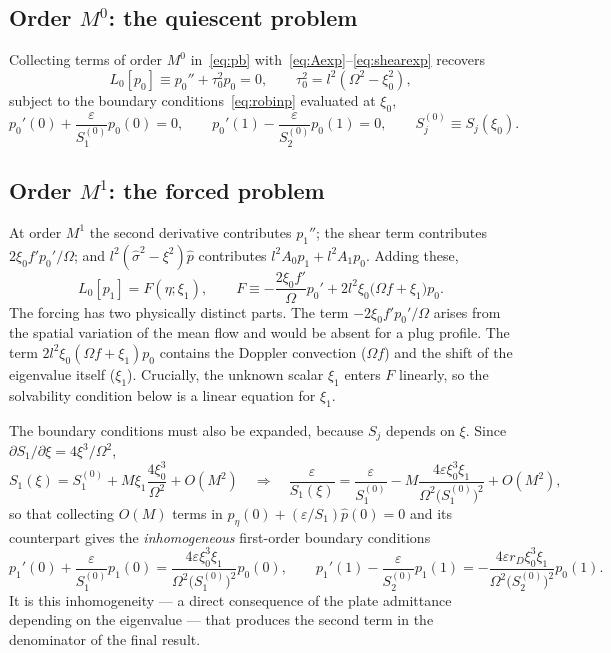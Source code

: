 \documentclass[11pt,a4paper]{article}
\newcommand{\Om}{\Omega}
\newcommand{\eps}{\varepsilon}
\newcommand{\sig}{\hat\sigma}
\theoremstyle{plain}
\theoremstyle{remark}
\begin{document}
\subsection{Order $M^0$: the quiescent problem}
Collecting terms of order $M^0$ in~\eqref{eq:pb} with~\eqref{eq:Aexp}--\eqref{eq:shearexp} recovers
\begin{equation}
L_0[p_0]\equiv p_0''+\tau_0^2p_0=0,\qquad \tau_0^2=l^2(\Om^2-\xi_0^2),
\label{eq:L0}
\end{equation}
subject to the boundary conditions~\eqref{eq:robinp} evaluated at $\xi_0$,
\begin{equation}
p_0'(0)+\frac{\eps}{S_1^{(0)}}p_0(0)=0,
\qquad
p_0'(1)-\frac{\eps}{S_2^{(0)}}p_0(1)=0,
\qquad S_j^{(0)}\equiv S_j(\xi_0).
\label{eq:bc0}
\end{equation}

\subsection{Order $M^1$: the forced problem}
At order $M^1$ the second derivative contributes $p_1''$; the shear term
contributes $2\xi_0f'p_0'/\Om$; and $l^2(\sig^2-\xi^2)\hat p$ contributes
$l^2A_0p_1+l^2A_1p_0$. Adding these,
\begin{equation}
L_0[p_1]=F(\eta;\xi_1),
\qquad
F\equiv-\frac{2\xi_0f'}{\Om}p_0'+2l^2\xi_0\bigl(\Om f+\xi_1\bigr)p_0 .
\label{eq:M1}
\end{equation}
The forcing has two physically distinct parts. The term $-2\xi_0f'p_0'/\Om$ arises from the spatial
variation of the mean flow and would be absent for a plug profile. The term
$2l^2\xi_0(\Om f+\xi_1)p_0$ contains the Doppler convection ($\Om f$) and the shift of the eigenvalue
itself ($\xi_1$). Crucially, the unknown scalar $\xi_1$ enters $F$ linearly, so the solvability
condition below is a linear equation for $\xi_1$.

The boundary conditions must also be expanded, because $S_j$ depends on $\xi$. Since
$\partial S_1/\partial\xi=4\xi^3/\Om^2$,
\begin{equation}
S_1(\xi)=S_1^{(0)}+M\xi_1\frac{4\xi_0^3}{\Om^2}+O(M^2)
\quad\Longrightarrow\quad
\frac{\eps}{S_1(\xi)}=\frac{\eps}{S_1^{(0)}}
-M\frac{4\eps\xi_0^3\xi_1}{\Om^2\bigl(S_1^{(0)}\bigr)^2}+O(M^2),
\end{equation}
so that collecting $O(M)$ terms in $\hat p_\eta(0)+(\eps/S_1)\hat p(0)=0$ and its counterpart gives the
\emph{inhomogeneous} first-order boundary conditions
\begin{equation}
p_1'(0)+\frac{\eps}{S_1^{(0)}}p_1(0)=\frac{4\eps\xi_0^3\xi_1}{\Om^2\bigl(S_1^{(0)}\bigr)^2}p_0(0),
\qquad
p_1'(1)-\frac{\eps}{S_2^{(0)}}p_1(1)=-\frac{4\eps r_D\xi_0^3\xi_1}{\Om^2\bigl(S_2^{(0)}\bigr)^2}p_0(1).
\label{eq:bc1}
\end{equation}
It is this inhomogeneity --- a direct consequence of the plate admittance depending on the eigenvalue
--- that produces the second term in the denominator of the final result.
\end{document}
